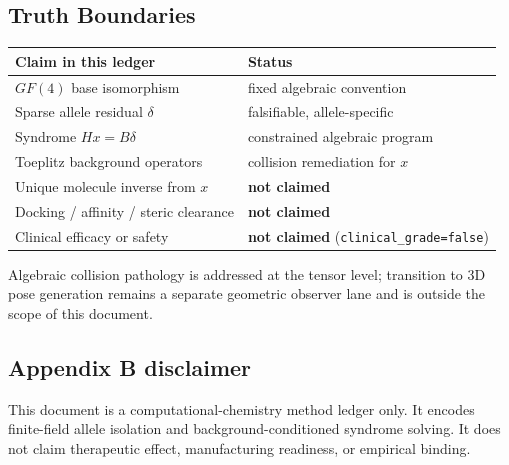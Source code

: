 \subsection{Truth Boundaries}
\begin{center}
\begin{tabular}{@{}lp{}@{}}
\toprule
Claim in this ledger & Status\\
\midrule
\(GF(4)\) base isomorphism & fixed algebraic convention\\
Sparse allele residual \(\delta\) & falsifiable, allele-specific\\
Syndrome \(Hx=B\delta\) & constrained algebraic program\\
Toeplitz background operators & collision remediation for \(x\)\\
Unique molecule inverse from \(x\) & \textbf{not claimed}\\
Docking / affinity / steric clearance & \textbf{not claimed}\\
Clinical efficacy or safety & \textbf{not claimed}
(\texttt{clinical\_grade=false})\\
\bottomrule
\end{tabular}
\end{center}

Algebraic collision pathology is addressed at the tensor level; transition to
3D pose generation remains a separate geometric observer lane and is outside
the scope of this document.

\subsection*{Appendix B disclaimer}
This document is a computational-chemistry method ledger only. It encodes
finite-field allele isolation and background-conditioned syndrome solving. It
does not claim therapeutic effect, manufacturing readiness, or empirical
binding.


